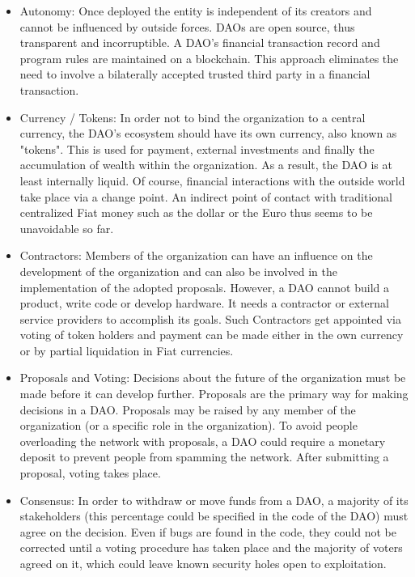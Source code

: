 \documentclass{scrartcl}
\begin{document}
    \begin{itemize}
    	\item Autonomy: \newline
    	Once deployed the entity is independent of its creators and cannot be influenced by outside forces. DAOs are open source, thus transparent and incorruptible. A DAO’s financial transaction record and program rules are maintained on a blockchain. This approach eliminates the need to involve a bilaterally accepted trusted third party in a financial transaction.
    	
    	\item Currency / Tokens: \newline
    	In order not to bind the organization to a central currency, the DAO's ecosystem should have its own currency, also known as "tokens". This is used for payment, external investments and finally the accumulation of wealth within the organization. As a result, the DAO is at least internally liquid. Of course, financial interactions with the outside world take place via a change point. An indirect point of contact with traditional centralized Fiat money such as the dollar or the Euro thus seems to be unavoidable so far.
    	
    	\item Contractors: \newline
    	Members of the organization can have an influence on the development of the organization and can also be involved in the implementation of the adopted proposals. However, a DAO cannot build a product, write code or develop hardware. It needs a contractor or external service providers to accomplish its goals. Such Contractors get appointed via voting of token holders and payment can be made either in the own currency or by partial liquidation in Fiat currencies.
    	
    	\item Proposals and Voting: \newline
    	Decisions about the future of the organization must be made before it can develop further. Proposals are the primary way for making decisions in a DAO. Proposals may be raised by any member of the organization (or a specific role in the organization). To avoid people overloading the network with proposals, a DAO could require a monetary deposit to prevent people from spamming the network. After submitting a proposal, voting takes place. 
    	
    	\item Consensus: \newline
    	In order to withdraw or move funds from a DAO, a majority of its stakeholders (this percentage could be specified in the code of the DAO) must agree on the decision. Even if bugs are found in the code, they could not be corrected until a voting procedure has taken place and the majority of voters agreed on it, which could leave known security holes open to exploitation.
    	

\end{itemize}
\end{document}
